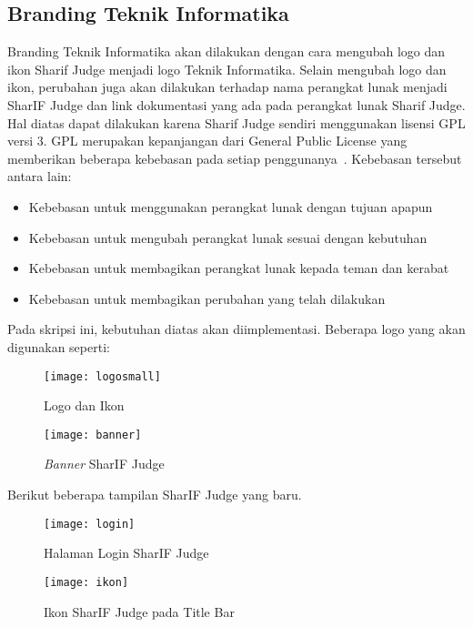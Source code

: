 \subsection{Branding Teknik Informatika}
Branding Teknik Informatika akan dilakukan dengan cara mengubah logo dan ikon Sharif Judge menjadi logo Teknik Informatika. Selain mengubah logo dan ikon, perubahan juga akan dilakukan terhadap nama perangkat lunak menjadi SharIF Judge dan link dokumentasi yang ada pada perangkat lunak Sharif Judge. Hal diatas dapat dilakukan karena Sharif Judge sendiri menggunakan lisensi GPL versi 3. GPL merupakan kepanjangan dari General Public License yang memberikan beberapa kebebasan pada setiap penggunanya~\cite{brett:10:moss}.
Kebebasan tersebut antara lain:
	\begin{itemize}
		\item Kebebasan untuk menggunakan perangkat lunak dengan tujuan apapun \\
		\item Kebebasan untuk mengubah perangkat lunak sesuai dengan kebutuhan \\
		\item Kebebasan untuk membagikan perangkat lunak kepada teman dan kerabat \\
		\item Kebebasan untuk membagikan perubahan yang telah dilakukan
	\end{itemize}
Pada skripsi ini, kebutuhan diatas akan diimplementasi. Beberapa logo yang akan digunakan seperti:

\begin{figure}[H]
	\centering  
	\texttt{[image: logosmall]}  
	\caption[Logo dan Ikon]{Logo dan Ikon} 
	\label{fig:logosmall} 
\end{figure} 

\begin{figure}[H]
	\centering  
	\texttt{[image: banner]}  
	\caption[\textit{Banner} SharIF Judge]{\textit{Banner} SharIF Judge} 
	\label{fig:banner} 
\end{figure} 

\pagebreak

Berikut beberapa tampilan SharIF Judge yang baru.
\begin{figure}[H]
	\centering  
	\texttt{[image: login]}  
	\caption[Halaman Login SharIF Judge]{Halaman Login SharIF Judge} 
	\label{fig:login} 
\end{figure}

\begin{figure}[H]
	\centering  
	\texttt{[image: ikon]}  
	\caption[Ikon SharIF Judge pada Title Bar]{Ikon SharIF Judge pada Title Bar} 
	\label{fig:ikon} 
\end{figure} 

